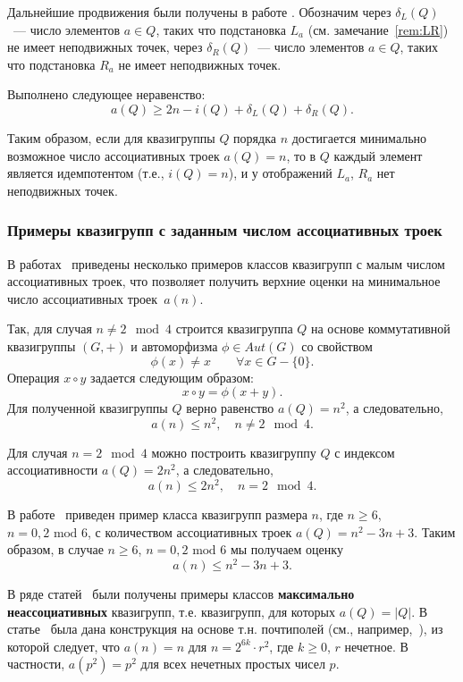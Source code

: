     Дальнейшие продвижения были получены в работе \cite{drapal2019high}.
    Обозначим через $\delta_L(Q)$~--- число элементов $a \in Q$, таких что подстановка $L_a$ (см. замечание~\ref{rem:LR}) не имеет неподвижных точек, через $\delta_R(Q)$~--- число элементов $a \in Q$, таких что подстановка $R_a$ не имеет неподвижных точек.
    \begin{proposition}
        Выполнено следующее неравенство:
        \[
            a(Q) \ge 2n - i(Q) + \delta_L(Q) + \delta_R(Q).
        \]
    \end{proposition}
    Таким образом, если для квазигруппы $Q$ порядка $n$ достигается минимально возможное число ассоциативных троек $a(Q) = n$, то в $Q$ каждый элемент является идемпотентом (т.е., $i(Q) = n$), и у отображений $L_a$, $R_a$ нет неподвижных точек.


\subsubsection{Примеры квазигрупп с заданным числом ассоциативных троек}

    В работах~\cite{kotzig83, ass_summary} приведены несколько примеров классов квазигрупп с малым числом ассоциативных троек, что позволяет получить верхние оценки на минимальное число ассоциативных троек~$a(n)$.

    Так, для случая $n \ne 2 \mod 4$ строится квазигруппа $Q$ на основе коммутативной квазигруппы $(G, +)$ и автоморфизма $\phi \in Aut(G)$ со свойством
    \[
        \phi(x) \ne x \qquad \forall x \in G-\{ 0 \}.
    \]
    Операция $x \circ y$ задается следующим образом:
    \[
        x \circ y = \phi(x + y).
    \]
    Для полученной квазигруппы $Q$ верно равенство $a(Q) = n^2$, а следовательно, 
    \[
        a(n) \le n^2, \quad n \ne 2 \mod 4.
    \]

    Для случая $n = 2 \mod 4$ можно построить квазигруппу $Q$ с индексом ассоциативности $a(Q) = 2n^2$, а следовательно, 
    \[
        a(n) \le 2n^2, \quad n = 2 \mod 4.
    \]

    В работе~\cite{kotzig83} приведен пример класса квазигрупп размера $n$, где $n \ge 6$, $n = 0, 2 \text{ mod } 6$, с количеством ассоциативных троек $a(Q) = n^2 - 3n + 3$. 
    Таким образом, в случае $n \ge 6$, ${n = 0, 2 \text{ mod } 6}$ мы получаем оценку 
    \[
        a(n) \le n^2 - 3n + 3.
    \]

    В ряде статей~\cite{drapal19nearfield, drapal2019ortho, lisonvek20field} были получены примеры классов \textbf{максимально неассоциативных} квазигрупп, т.е. квазигрупп, для которых $a(Q) = \lvert Q \rvert$.
    В статье~\cite{drapal19nearfield} была дана конструкция на основе т.н. почтиполей (см., например,~\cite{ionin2009}), из которой следует, что $a(n) = n$ для $n = 2^{6k} \cdot r^2$, где $k \ge 0$, $r$ нечетное.
    В частности, $a(p^2) = p^2$ для всех нечетных простых чисел $p$.
    
